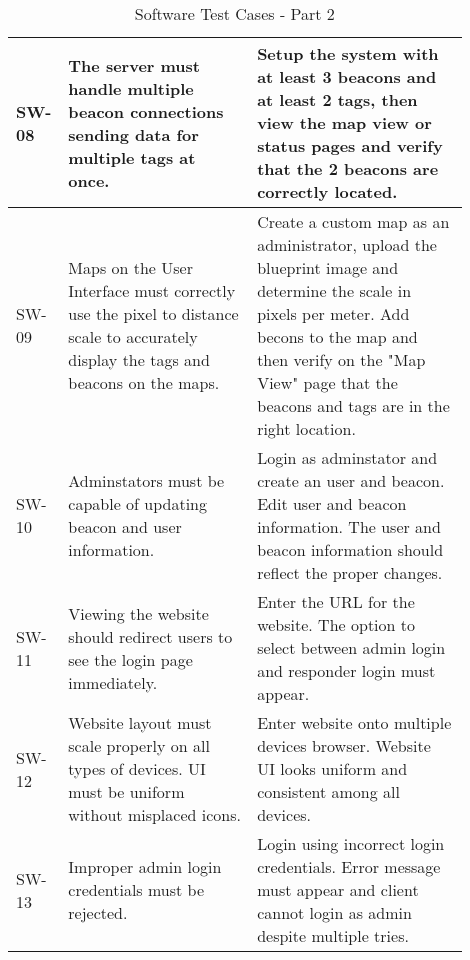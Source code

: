 \pagebreak
\bgroup
\def\arraystretch{1.25}
\begin{table}[h!]
    \centering
    \begin{tabular}{|p{0.05\linewidth}|p{0.40\linewidth}|p{0.45\linewidth}|}

    \hline
    SW-08
    & The server must handle multiple beacon connections sending data for multiple tags at once.
    & Setup the system with at least 3 beacons and at least 2 tags, then view the map view or status pages and verify that the 2 beacons are correctly located. \\

    \hline
    SW-09
    & Maps on the User Interface must correctly use the pixel to distance scale to accurately display the tags and beacons on the maps.
    & Create a custom map as an administrator, upload the blueprint image and determine the scale in pixels per meter. Add becons to the map and then verify on the "Map View" page that the beacons and tags are in the right location. \\
    
    \hline
    SW-10
    & Adminstators must be capable of updating beacon and user information. 
    & Login as adminstator and create an user and beacon. Edit user and beacon information. The user and beacon information should reflect the proper changes. \\
    
    \hline
    SW-11
    & Viewing the website should redirect users to see the login page immediately.
    & Enter the URL for the website. The option to select between admin login and responder login must appear. \\

    \hline
    SW-12
    & Website layout must scale properly on all types of devices. UI must be uniform without misplaced icons.
    & Enter website onto multiple devices browser. Website UI looks uniform and consistent among all devices. \\

    \hline
    SW-13
    & Improper admin login credentials must be rejected.
    & Login using incorrect login credentials. Error message must appear and client cannot login as admin despite multiple tries. \\
    
    \hline
    \end{tabular}
    \caption{Software Test Cases - Part 2}
\end{table}
